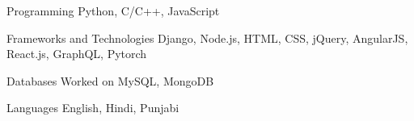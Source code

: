 


\begin{cvskills}


\cvskill
{Programming} %
{Python, C/C++, JavaScript} %


\cvskill
{Frameworks and Technologies} %
{Django, Node.js, HTML, CSS, jQuery, AngularJS, React.js, GraphQL, Pytorch} %


\cvskill
{Databases} %
{Worked on MySQL, MongoDB} %


\cvskill
{Languages} %
{English, Hindi, Punjabi} %


\end{cvskills}